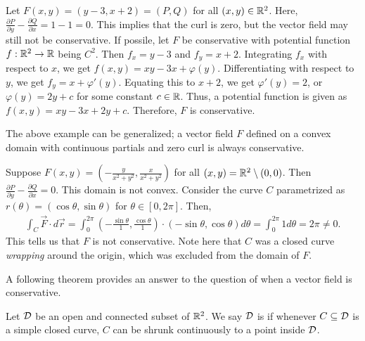 \begin{example}
    Let $F(x,y) = (y-3,x+2) = (P,Q)$ for all $(x,y) \in \mathbb{R}^{2}$. Here, $\frac{\partial P}{\partial y} - \frac{\partial Q}{\partial x} = 1 -1 = 0$. This implies that the curl is zero, but the vector field may still not be conservative. If possile, let $F$ be conservative with potential function $f:\mathbb{R}^{2} \to \mathbb{R}$ being $C^{2}$. Then $f_{x} = y-3$ and $f_{y} = x+2$. Integrating $f_{x}$ with respect to $x$, we get $f(x,y) = xy - 3x + \varphi(y)$. Differentiating with respect to $y$, we get $f_{y} = x + \varphi'(y)$. Equating this to $x+2$, we get $\varphi'(y) = 2$, or $\varphi(y) = 2y + c$ for some constant $c \in \mathbb{R}$. Thus, a potential function is given as $f(x,y) = xy - 3x + 2y + c$. Therefore, $F$ is conservative.
\end{example}

The above example can be generalized; a vector field $F$ defined on a convex domain with continuous partials and zero curl is always conservative.

\begin{example}
    Suppose $F(x,y) = (-\frac{y}{x^{2}+y^{2}}, \frac{x}{x^{2}+y^{2}})$ for all $(x,y) = \mathbb{R}^{2}\setminus (0,0)$. Then $\frac{\partial P}{\partial y} - \frac{\partial Q}{\partial x} = 0$. This domain is not convex. Consider the curve $C$ parametrized as $r(\theta) = (\cos \theta, \sin \theta)$ for $\theta \in [0,2\pi]$. Then,
    \begin{align}
        \int_{C} \vec{F} \cdot d\vec{r} = \int_{0}^{2\pi} \left( -\frac{\sin \theta}{1}, \frac{\cos \theta}{1} \right) \cdot (-\sin \theta, \cos \theta) d\theta = \int_{0}^{2\pi} 1 d\theta = 2\pi \neq 0.
    \end{align}
    This tells us that $F$ is not conservative. Note here that $C$ was a closed curve \textit{wrapping} around the origin, which was excluded from the domain of $F$.
\end{example}

A following theorem provides an answer to the question of when a vector field is conservative.

\begin{definition}
    Let $\mathcal{D}$ be an open and connected subset of $\mathbb{R}^{2}$. We say $\mathcal{D}$ is  if whenever $C \subseteq \mathcal{D}$ is a simple closed curve, $C$ can be shrunk continuously to a point inside $\mathcal{D}$.
\end{definition}